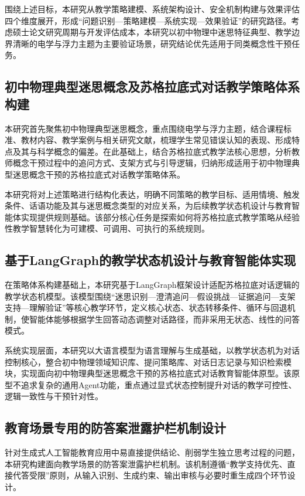围绕上述目标，本研究从教学策略建模、系统架构设计、安全机制构建与效果评估四个维度展开，形成“问题识别—策略建模—系统实现—效果验证”的研究路径。考虑硕士论文研究周期与开发评估成本，本研究以初中物理中迷思特征典型、教学边界清晰的电学与浮力主题为主要验证场景，研究结论优先适用于同类概念性干预任务。

\subsection{初中物理典型迷思概念及苏格拉底式对话教学策略体系构建}

本研究首先聚焦初中物理典型迷思概念，重点围绕电学与浮力主题，结合课程标准、教材内容、教学案例与相关研究文献，梳理学生常见错误认知的表现、形成特点及其与科学概念的偏差。在此基础上，结合苏格拉底式教学法核心思想，分析教师概念干预过程中的追问方式、支架方式与引导逻辑，归纳形成适用于初中物理典型迷思概念干预的苏格拉底式对话教学策略体系。

本研究将对上述策略进行结构化表达，明确不同策略的教学目标、适用情境、触发条件、话语功能及其与迷思概念类型的对应关系，为后续教学状态机设计与教育智能体实现提供规则基础。该部分核心任务是探索如何将苏格拉底式教学策略从经验性教学智慧转化为可建模、可调用、可执行的系统规则。

\subsection{基于LangGraph的教学状态机设计与教育智能体实现}

在策略体系构建基础上，本研究基于LangGraph框架设计适配苏格拉底对话逻辑的教学状态机模型。该模型围绕“迷思识别—澄清追问—假设挑战—证据追问—支架支持—理解验证”等核心教学环节，定义核心状态、状态转移条件、循环与回退机制，使智能体能够根据学生回答动态调整对话路径，而非采用无状态、线性的问答模式。

系统实现层面，本研究以大语言模型为语言理解与生成基础，以教学状态机为对话控制核心，整合初中物理领域知识库、提问策略库、对话日志记录与知识检索模块，实现面向初中物理典型迷思概念干预的苏格拉底式对话教育智能体原型。该原型不追求复杂的通用Agent功能，重点通过显式状态控制提升对话的教学可控性、逻辑一致性与干预针对性。

\subsection{教育场景专用的防答案泄露护栏机制设计}

针对生成式人工智能教育应用中易直接提供结论、削弱学生独立思考过程的问题，本研究构建面向教学场景的防答案泄露护栏机制。该机制遵循“教学支持优先、直接代答受限”原则，从输入识别、生成约束、输出审核与必要时重生成四个环节设计。

